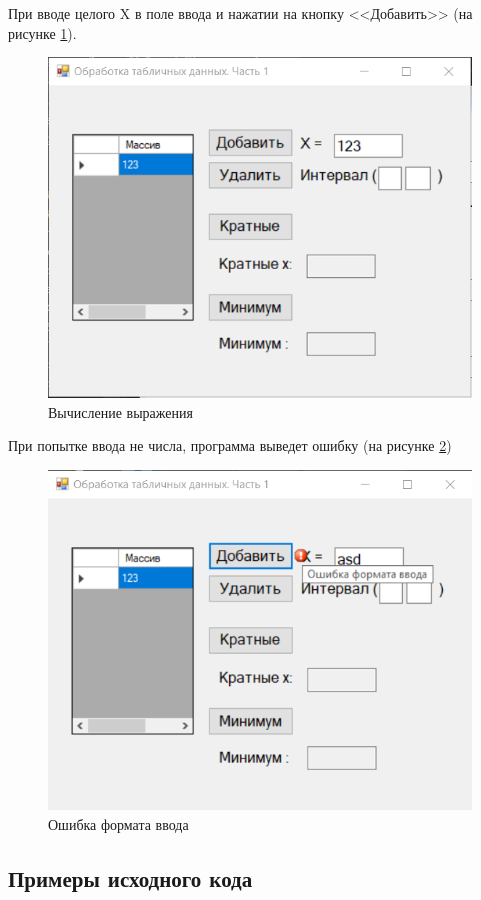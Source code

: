 При вводе целого X в поле ввода и нажатии на кнопку <<Добавить>> (на рисунке \ref{task4_launch2}).
\begin{figure}[H]
    \centering
    \includegraphics[width=0.6\linewidth]{lections/img/task4_launch2.png}
    \caption{Вычисление выражения}
    \label{task4_launch2}
\end{figure}

При попытке ввода не числа, программа выведет ошибку (на рисунке \ref{task4_launch3})
\begin{figure}[H]
    \centering
    \includegraphics[width=0.7\linewidth]{lections/img/task4_launch3.png}
    \caption{Ошибка формата ввода}
    \label{task4_launch3}
\end{figure}

\subsection{Примеры исходного кода}



